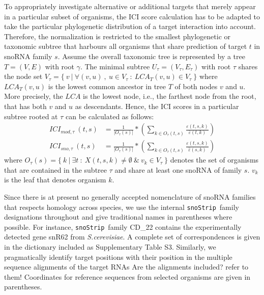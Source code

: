 \documentclass[preprint,3p,times,twocolumn]{elsarticle}
\newcommand{\TODO}[1] {\begingroup\color{red}#1\endgroup}
\newcommand{\snostrip}{\texttt{snoStrip}}
\newcommand{\sce}{\emph{S.cerevisiae}}
\begin{document}
To appropriately investigate alternative or additional targets that merely
appear in a particular subset of organisms, the ICI score calculation has
to be adapted to take the particular phylogenetic distribution of a target
interaction into account. Therefore, the normalization is restricted to the
smallest phylogenetic or taxonomic subtree that harbours all organisms that
share prediction of target $t$ in snoRNA family $s$.  Assume the overall
taxonomic tree is represented by a tree $T=(V,E)$ with root $\gamma$. The
minimal subtree $U_\tau = (V_\tau, E_\tau)$ with root $\tau$ shares the
node set $V_\tau = \{\ v\ |\ \forall (v,u)\ ,\ u \in V_\tau\ :\ LCA_T(v,u)
\in V_\tau\ \}$ where $LCA_T(v,u)$ is the lowest common ancestor in tree
$T$ of both nodes $v$ and $u$. More precisely, the $LCA$ is the lowest
node, i.e., the farthest node from the root, that has both $v$ and $u$ as
descendants.  Hence, the ICI scores in a particular subtree rooted at
$\tau$ can be calculated as follows:
\begin{equation}
  \begin{split}
    ICI_{mod,\tau}\:(t,s) & = \frac{1}{|O_\tau(s)|} * \left( \sum_{k\in O_\tau(t,s)} \frac{\varepsilon(t,s,k)}{\bar\varepsilon(t,k)} \right)
    \\
    ICI_{sno,\tau}\:(t,s) & = \frac{1}{|O_\tau(s)|} * \left( \sum_{k\in O_\tau(t,s)} \frac{\varepsilon(t,s,k)}{\hat\varepsilon(s,k)} \right)
  \end{split}
\end{equation}
where
$O_\tau(s) = \{\ k\ |\ \exists t\ :\ X(t,s,k) \ne \emptyset\ \&\ v_k
\in V_\tau\ \}$ denotes the set of organisms that are contained in the
subtree $\tau$ and share at least one snoRNA of family $s$. $v_k$ is
the leaf that denotes organism $k$.

Since there is at present no generally accepted nomenclature of snoRNA
families that respects homology across species, we use the internal
\snostrip\ family designations throughout and give traditional names in
parentheses where possible. For instance, \snostrip\ family CD\_22 contains
the experimentally detected gene snR62 from \sce. A complete set of
correspondences is given in the dictionary included as Supplementary Table
S3. Similarly, we pragmatically identify target positions with their
position in the multiple sequence alignments of the target RNAs
\TODO{Are the alignments included? refer to them!} Coordinates for
reference sequences from selected organisms are given in parentheses.

\end{document}
